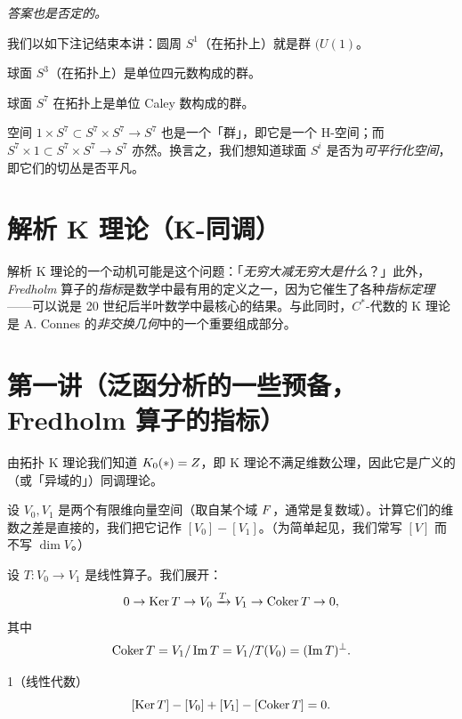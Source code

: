 \emph{答案也是否定的。}

我们以如下注记结束本讲：圆周 $S^1$（在拓扑上）就是群 $(U(1)$。

球面 $S^3$（在拓扑上）是单位四元数构成的群。

球面 $S^7$ 在拓扑上是单位 Caley 数构成的群。

空间 $1\times S^7\subset S^7\times S^7\to S^7$ 也是一个「群」，即它是一个 H-空间；而 $S^7\times 1\subset S^7\times S^7\to S^7$ 亦然。换言之，我们想知道球面 $S^i$ 是否为\emph{可平行化空间}，即它们的切丛是否平凡。


\section{解析 K 理论（K-同调）}

解析 K 理论的一个动机可能是这个问题：「\emph{无穷大减无穷大是什么}？」此外，\emph{Fredholm} 算子的\emph{指标}是数学中最有用的定义之一，因为它催生了各种\emph{指标定理}——可以说是 20 世纪后半叶数学中最核心的结果。与此同时，$C^*$-代数的 K 理论是 A. Connes 的\emph{非交换几何}中的一个重要组成部分。

\section{第一讲（泛函分析的一些预备，Fredholm 算子的指标）}

由拓扑 K 理论我们知道 $K_0(*)=Z$，即 K 理论不满足维数公理，因此它是广义的（或「异域的」）同调理论。

设 $V_0,V_1$ 是两个有限维向量空间（取自某个域 $F$，通常是复数域）。计算它们的维数之差是直接的，我们把它记作 $[V_0]-[V_1]$。（为简单起见，我们常写 $[V]$ 而不写 $\dim V$。）

设 $T:V_0\to V_1$ 是线性算子。我们展开：
\[ 0\to\operatorname{Ker} T\to V_0\xrightarrow{T}V_1\to\operatorname{Coker} T\to 0, \]
其中
\[ \operatorname{Coker} T=V_1/\operatorname{Im} T=V_1/T(V_0)=(\operatorname{Im} T)^\perp. \]

\begin{thm}{1（线性代数）}
\[ [\operatorname{Ker} T]-[V_0]+[V_1]-[\operatorname{Coker} T]=0. \]
\end{thm}

